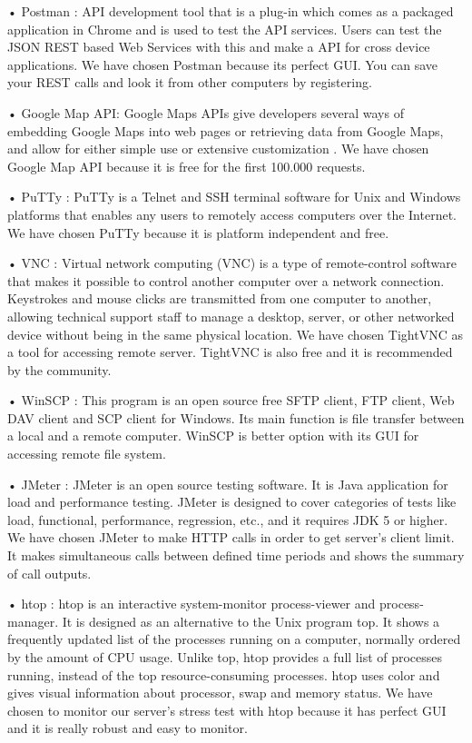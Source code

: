 • Postman : API development tool that is a plug-in which comes as a packaged application in Chrome and is used to test the API services. Users can test the JSON REST based Web Services with this and make a API for cross device applications. 
\cite{PostmanTanim}
We have chosen Postman because its perfect GUI. You can save your REST calls and look it from other computers by registering. 

• Google Map API: Google Maps APIs give developers several ways of embedding Google Maps into web pages or retrieving data from Google Maps, and allow for either simple use or extensive customization \cite{googleMapAPI}. 
We have chosen Google Map API because it is free for the first 100.000 requests.

• PuTTy : PuTTy is a Telnet and SSH terminal software for Unix and Windows platforms that enables any users to remotely access computers over the Internet. 
\cite{PuttyTanim}
We have chosen PuTTy because it is platform independent and free.

• VNC : Virtual network computing (VNC) is a type of remote-control software that makes it possible to control another computer over a network connection. Keystrokes and mouse clicks are transmitted from one computer to another, allowing technical support staff to manage a desktop, server, or other networked device without being in the same physical location. 
\cite{VNCTanim}
We have chosen TightVNC as a tool for accessing remote server. TightVNC is also free and it is recommended by the community.

• WinSCP : This program is an open source free SFTP client, FTP client, Web DAV client and SCP client for Windows. Its main function is file transfer between a local and a remote computer.
\cite{WinSCPTanim}
 WinSCP is better option with its GUI for accessing remote file system. 
 
• JMeter : JMeter is an open source testing software. It is Java application for load and performance testing. JMeter is designed to cover categories of tests like load, functional, performance, regression, etc., and it requires JDK 5 or higher. \cite{JMeterTanim}
We have chosen JMeter to make HTTP calls in order to get server's client limit. It makes simultaneous calls between defined time periods and shows the summary of call outputs.

• htop : htop is an interactive system-monitor process-viewer and process-manager. It is designed as an alternative to the Unix program top. It shows a frequently updated list of the processes running on a computer, normally ordered by the amount of CPU usage. Unlike top, htop provides a full list of processes running, instead of the top resource-consuming processes. htop uses color and gives visual information about processor, swap and memory status.\cite{htopTanim}
We have chosen to monitor our server's stress test with htop because it has perfect GUI and it is really robust and easy to monitor.


